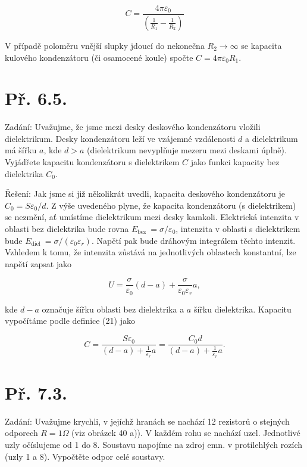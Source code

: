 \documentclass[czech,11pt,a4paper]{article}
\begin{document}
$$
C=\frac{4 \pi \varepsilon_{0}}{\left(\frac{1}{R_{1}}-\frac{1}{R_{2}}\right)}
$$

$\mathrm{V}$ případě poloměru vnější slupky jdoucí do nekonečna $R_{2} \rightarrow \infty$ se kapacita kulového kondenzátoru (či osamocené koule) spočte $C=4 \pi \varepsilon_{0} R_{1}$.

\section{Př. 6.5.}

Zadání: Uvažujme, že jsme mezi desky deskového kondenzátoru vložili dielektrikum. Desky kondenzátoru leží ve vzájemné vzdálenosti $d$ a dielektrikum má šířku $a$, kde $d>a$ (dielektrikum nevyplňuje mezeru mezi deskami úplně). Vyjádřete kapacitu kondenzátoru s dielektrikem $C$ jako funkci kapacity bez dielektrika $C_{0}$.

Řešení: Jak jsme si již několikrát uvedli, kapacita deskového kondenzátoru je $C_{0}=S \varepsilon_{0} / d$. Z výše uvedeného plyne, že kapacita kondenzátoru (s dielektrikem) se nezmění, ať umístíme dielektrikum mezi desky kamkoli. Elektrická intenzita v oblasti bez dielektrika bude rovna $E_{\text {bez }}=\sigma / \varepsilon_{0}$, intenzita $\mathrm{v}$ oblasti s dielektrikem bude $E_{\text {diel }}=\sigma /\left(\varepsilon_{0} \varepsilon_{r}\right)$. Napětí pak bude dráhovým integrálem těchto intenzit. Vzhledem k tomu, že intenzita zůstává na jednotlivých oblastech konstantní, lze napětí zapsat jako

$$
U=\frac{\sigma}{\varepsilon_{0}}(d-a)+\frac{\sigma}{\varepsilon_{0} \varepsilon_{r}} a,
$$

kde $d-a$ označuje šířku oblasti bez dielektrika a $a$ šířku dielektrika. Kapacitu vypočítáme podle definice (21) jako



$$
C=\frac{S \varepsilon_{0}}{(d-a)+\frac{1}{\varepsilon_{r}} a}=\frac{C_{0} d}{(d-a)+\frac{1}{\varepsilon_{r}} a} .
$$

\section{Př. 7.3.}

Zadání: Uvažujme krychli, v jejíchž hranách se nachází 12 rezistorů o stejných odporech $R=1 \Omega$ (viz obrázek 40 a)). V každém rohu se nachází uzel. Jednotlivé uzly očíslujeme od 1 do 8. Soustavu napojíme na zdroj emn. v protilehlých rozích (uzly 1 a 8). Vypočtěte odpor celé soustavy.
\end{document}
